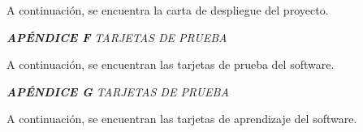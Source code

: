 \documentclass[spanish]{ieee_upb}
\begin{document}
A continuación, se encuentra la carta de despliegue del proyecto. 




\raggedright\textit{\textbf{APÉNDICE F} TARJETAS DE PRUEBA}
\label{APÉNDICE:F}

A continuación, se encuentran las tarjetas de prueba del software.  






\raggedright\textit{\textbf{APÉNDICE G} TARJETAS DE PRUEBA}
\label{APÉNDICE:G}

A continuación, se encuentran las tarjetas de aprendizaje del software.  




\end{document}
